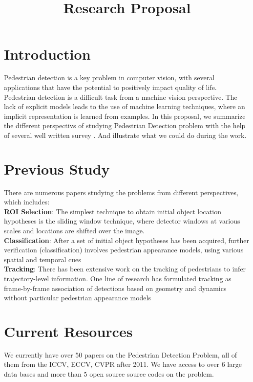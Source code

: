 \documentclass[conference]{IEEEtran}
\begin{document}
\title{Research Proposal}
\author{
      \small{}
	}
\maketitle
\section{Introduction}
Pedestrian detection is a key problem in computer vision,
with several applications that have the potential to positively
impact quality of life.\\\indent
Pedestrian detection is a difficult task from a machine
vision perspective. The lack of explicit models leads to the
use of machine learning techniques, where an implicit
representation is learned from examples.
In this proposal, we summarize the different perspectivs of studying
Pedestrian Detection problem with the help of several well written survey \cite{S1,S2,S3}.
And illustrate what we could do during the work.
\section{Previous Study}
There are numerous papers studying the problems from different perspectives, which includes:\\\indent
\textbf{ROI Selection}:
The simplest technique to obtain initial object location
hypotheses is the sliding window technique,
where detector windows at various scales and locations are shifted over the
image.\\\indent
\textbf{Classification}:
After a set of initial object hypotheses has been acquired,
further verification (classification) involves pedestrian
appearance models, using various spatial and temporal
cues\\\indent
\textbf{Tracking}:
There has been extensive work on the tracking of
pedestrians to infer trajectory-level information. One line
of research has formulated tracking as frame-by-frame
association of detections based on geometry and dynamics
without particular pedestrian appearance models 
\section{Current Resources}
We currently have over 50 papers on the Pedestrian Detection Problem,
all of them from the ICCV, ECCV, CVPR after 2011.
We have access to over 6 large data bases and more than 5 open source source codes on the problem.
\end{document}
